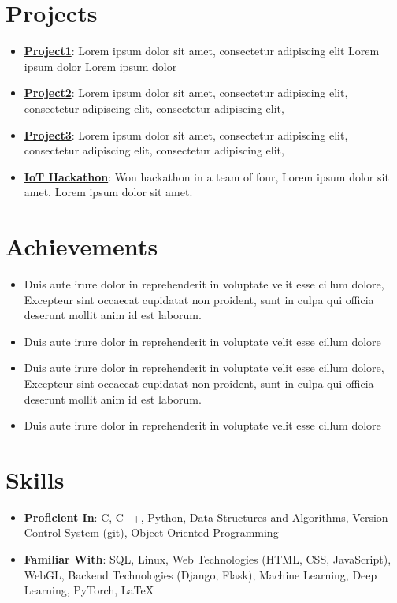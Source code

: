 \documentclass[letterpaper,11pt]{article}
\newcommand{\resumeSubHeadingListStart}{\begin{itemize}[leftmargin=*]}
\newcommand{\resumeSubHeadingListEnd}{\end{itemize}}
\newcommand{\resumeItemListStart}{\begin{itemize}}
\newcommand{\resumeItemListEnd}{\end{itemize}\vspace{-5pt}}
\begin{document}
\section{Projects}
  \setlength{\itemsep}{0.5pt}
    \begin{itemize}
    \item\textbf{\href{https://foo.bar}{Project1}}{: Lorem ipsum dolor sit amet, consectetur adipiscing elit Lorem ipsum dolor Lorem ipsum dolor}
    \item\textbf{\href{https://foo.bar}{Project2}}{: Lorem ipsum dolor sit amet, consectetur adipiscing elit, consectetur adipiscing elit, consectetur adipiscing elit,}
    \item\textbf{\href{https://foo.bar}{Project3}}{: Lorem ipsum dolor sit amet, consectetur adipiscing elit, consectetur adipiscing elit, consectetur adipiscing elit,}
    \item\textbf{\href{https://hacakathon.com}{IoT Hackathon}}{: Won hackathon in a team of four, Lorem ipsum dolor sit amet. Lorem ipsum dolor sit amet.}
    \end{itemize}

\section{Achievements}
  \resumeItemListStart
    \item
      Duis aute irure dolor in reprehenderit in voluptate velit esse cillum dolore, Excepteur sint occaecat cupidatat non proident, sunt in culpa qui officia deserunt mollit anim id est laborum.
    \item
      Duis aute irure dolor in reprehenderit in voluptate velit esse cillum dolore
    \item
      Duis aute irure dolor in reprehenderit in voluptate velit esse cillum dolore, Excepteur sint occaecat cupidatat non proident, sunt in culpa qui officia deserunt mollit anim id est laborum.
    \item
      Duis aute irure dolor in reprehenderit in voluptate velit esse cillum dolore
  \resumeItemListEnd

\section{Skills}
  \resumeSubHeadingListStart
    \item\textbf{Proficient In}{: C, C++, Python, Data Structures and Algorithms, Version Control System (git), Object Oriented Programming}
    \item\textbf{Familiar With}{: SQL, Linux, Web Technologies (HTML, CSS, JavaScript), WebGL, Backend Technologies (Django, Flask), Machine Learning, Deep Learning, PyTorch, \LaTeX}
  \resumeSubHeadingListEnd
\end{document}
